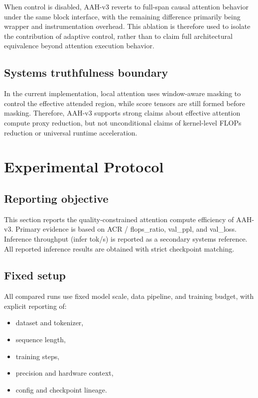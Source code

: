 \documentclass[11pt]{article}
\begin{document}
When control is disabled, AAH-v3 reverts to full-span causal attention behavior under the same block interface, with the remaining difference primarily being wrapper and instrumentation overhead. This ablation is therefore used to isolate the contribution of adaptive control, rather than to claim full architectural equivalence beyond attention execution behavior.

\subsection{Systems truthfulness boundary}

In the current implementation, local attention uses window-aware masking to control the effective attended region, while score tensors are still formed before masking. Therefore, AAH-v3 supports strong claims about effective attention compute proxy reduction, but not unconditional claims of kernel-level FLOPs reduction or universal runtime acceleration.



\section{Experimental Protocol}

\subsection{Reporting objective}

This section reports the quality-constrained attention compute efficiency of AAH-v3. Primary evidence is based on ACR / flops_ratio, val_ppl, and val_loss. Inference throughput (infer tok/s) is reported as a secondary systems reference. All reported inference results are obtained with strict checkpoint matching.

\subsection{Fixed setup}

All compared runs use fixed model scale, data pipeline, and training budget, with explicit reporting of:
\begin{itemize}
\item dataset and tokenizer,
\item sequence length,
\item training steps,
\item precision and hardware context,
\item config and checkpoint lineage.
\end{itemize}
\end{document}
